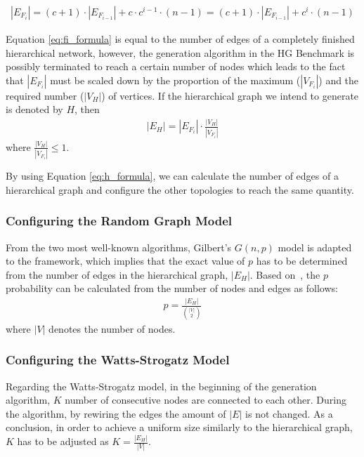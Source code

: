 \begin{align}\label{eq:fi_formula}
	|E_{F_i}| = (c+1) \cdot |E_{F_{i-1}}| + c \cdot c^{i-1} \cdot (n - 1)	= (c+1) \cdot |E_{F_{i-1}}| + c^i \cdot (n - 1)
\end{align}

Equation \ref{eq:fi_formula} is equal to the number of edges of a completely finished hierarchical network, however, the generation algorithm in the HG Benchmark is possibly terminated to reach a certain number of nodes which leads to the fact that $|E_{F_i}|$ must be scaled down by the proportion of the maximum ($|V_{F_i}|$) and the required number ($|V_H|$) of vertices. If the hierarchical graph we intend to generate is denoted by $H$, then
\begin{align}\label{eq:h_formula}
	|E_H| = |E_{F_i}| \cdot \frac{|V_H|}{|V_{F_i}|}
\end{align}
where $\frac{|V_H|}{|V_{F_i}|} \leq 1$.

By using Equation \ref{eq:h_formula}, we can calculate the number of edges of a hierarchical graph and configure the other topologies to reach the same quantity.

\subsubsection{Configuring the Random Graph Model}
From the two most well-known algorithms, Gilbert's $G(n,p)$ model is adapted to the framework, which implies that the exact value of $p$ has to be determined from the number of edges in the hierarchical graph, $|E_H|$. Based on~\cite{random_p}, the $p$ probability can be calculated from the number of nodes and edges as follows:
\begin{align}
	p = \frac{|E_H|}{\binom{|V|}{2}}
\end{align}
where $|V|$ denotes the number of nodes.

\subsubsection{Configuring the Watts-Strogatz Model}\label{sec:watts_generation}

Regarding the Watts-Strogatz model, in the beginning of the generation algorithm, $K$ number of consecutive nodes are connected to each other. During the algorithm, by rewiring the edges the amount of $|E|$ is not changed. As a conclusion, in order to achieve a uniform size similarly to the hierarchical graph, $K$ has to be adjusted as $K = \frac{|E_H|}{|V|}$.

